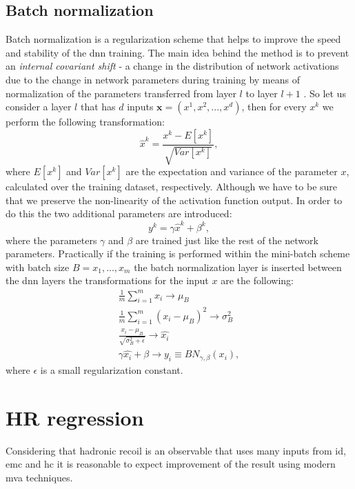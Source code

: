 \subsection{Batch normalization}
Batch normalization is a regularization scheme that helps to improve the speed and stability of the \gls{dnn} training. The main idea behind the method is to prevent an \textit{internal covariant shift} - a change in the distribution of network activations due to the change in network parameters during training by means of normalization of the parameters transferred from layer $l$ to layer $l+1$  \cite{batch_normalization}. So let us consider a layer $l$ that has $d$ inputs $\textbf{x}=(x^1,x^2,...,x^d)$, then for every $x^k$ we perform the following transformation:
\begin{equation}
\label{eq::bn1}
\hat{x}^k=\frac{x^k-E[x^k]}{\sqrt{Var[x^k]}},
\end{equation}
where $E[x^k]$ and $Var[x^k]$ are the expectation and variance of the parameter $x$, calculated over the training dataset, respectively. Although we have to be sure that we preserve the non-linearity of the activation function output. In order to do this the two additional parameters are introduced:
\begin{equation}
\label{eq::bn2}
y^k=\gamma  \hat{x}^k + \beta^k ,
\end{equation}
where the parameters $\gamma$ and $\beta$ are trained just like the rest of the network parameters.
Practically if the training is performed within the mini-batch scheme with batch size $B={x_1,...,x_m}$ the batch normalization layer is inserted between the \gls{dnn} layers the transformations for the input $x$ are the following:
\begin{equation}
\begin{array}{lcl} 
\frac{1}{m}\sum_{i=1}^m x_i \rightarrow \mu_B\\
\frac{1}{m}\sum_{i=1}^m (x_i - \mu_B)^2 \rightarrow \sigma^2_B\\
\frac {x_i-\mu_B}{\sqrt{\sigma_B^2+\epsilon}} \rightarrow \hat{x_i}\\
\gamma \hat{x_i} + \beta \rightarrow y_i \equiv BN_{\gamma,\beta}(x_i),
\end{array}
\end{equation}
where $\epsilon$ is a small regularization constant. 
\section{HR regression}
Considering that hadronic recoil is an observable that uses many inputs from \gls{id}, \gls{emc} and \gls{hc} it is reasonable to expect improvement of the result using modern \gls{mva} techniques. 
